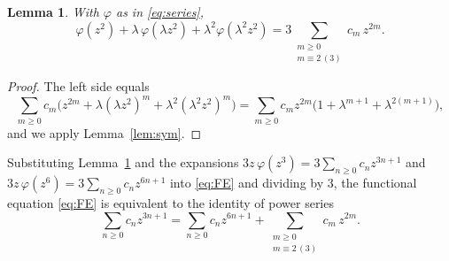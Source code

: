 \documentclass{amsart}
\newtheorem{lemma}{Lemma}
\theoremstyle{remark}
\begin{document}
\begin{lemma}\label{lem:terms}
With $\varphi$ as in \eqref{eq:series},
\[
\varphi(z^2)+\lambda\,\varphi(\lambda z^2)+\lambda^2\varphi(\lambda^2 z^2)
=3\!\!\sum_{\substack{m\ge 0\\ m\equiv 2\,(3)}}\!\! c_m\,z^{2m}.
\]
\end{lemma}
\begin{proof}
The left side equals
\[
\sum_{m\ge 0} c_m\bigl(z^{2m}+\lambda(\lambda z^2)^m+\lambda^2(\lambda^2 z^2)^m\bigr)
=\sum_{m\ge0}c_m z^{2m}\bigl(1+\lambda^{m+1}+\lambda^{2(m+1)}\bigr),
\]
and we apply Lemma~\ref{lem:sym}.
\end{proof}

Substituting Lemma~\ref{lem:terms} and the expansions
$3z\,\varphi(z^3)=3\sum_{n\ge0}c_n z^{3n+1}$ and
$3z\,\varphi(z^6)=3\sum_{n\ge0}c_n z^{6n+1}$ into \eqref{eq:FE} and dividing by $3$, the
functional equation \eqref{eq:FE} is equivalent to the identity of power series
\begin{equation}\label{eq:three}
\sum_{n\ge0}c_n z^{3n+1}
=\sum_{n\ge0}c_n z^{6n+1}
+\!\!\sum_{\substack{m\ge0\\ m\equiv2\,(3)}}\!\! c_m\,z^{2m}.
\end{equation}
\end{document}
